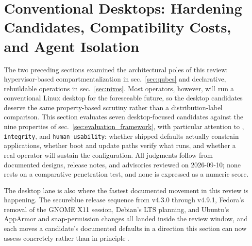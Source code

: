 \documentclass[
  english,
  9pt,
]{extarticle}
\newcounter{none} %
\begin{document}
\newpage

\section{Conventional Desktops: Hardening Candidates, Compatibility
Costs, and Agent Isolation}\label{sec:desktops}

The two preceding sections examined the architectural poles of this
review: hypervisor-based compartmentalization in sec.~\ref{sec:qubes}
and declarative, rebuildable operations in sec.~\ref{sec:nixos}. Most
operators, however, will run a conventional Linux desktop for the
foreseeable future, so the desktop candidates deserve the same
property-based scrutiny rather than a distribution-label comparison.
This section evaluates seven desktop-focused candidates against the nine
properties of sec.~\ref{sec:evaluation_framework}, with particular
attention to , \texttt{integrity}, and
\texttt{human\_usability}: whether shipped defaults actually constrain
applications, whether boot and update paths verify what runs, and
whether a real operator will sustain the configuration. All judgments
follow from documented designs, release notes, and advisories reviewed
on 2026-09-10; none rests on a comparative penetration test, and none is
expressed as a numeric score.

The desktop lane is also where the fastest documented movement in this
review is happening. The secureblue release sequence from v4.3.0 through
v4.9.1, Fedora's removal of the GNOME X11 session, Debian's LTS
planning, and Ubuntu's AppArmor and snap-permission changes all landed
inside the review window, and each moves a candidate's documented
defaults in a direction this section can now assess concretely rather
than in principle
\citep{secureblue_v430, secureblue_v491, fedora_wayland_only, debian_trixie, ubuntu_2604_security}.
\end{document}
